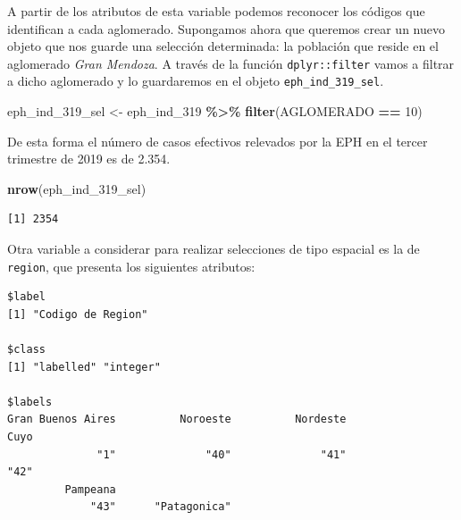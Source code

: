 \documentclass[
]{article}
\newenvironment{Shaded}{\begin{snugshade}}{\end{snugshade}}
\newcommand{\DecValTok}[1]{\textcolor[rgb]{0.00,0.00,0.81}{#1}}
\newcommand{\FunctionTok}[1]{\textcolor[rgb]{0.13,0.29,0.53}{\textbf{#1}}}
\newcommand{\NormalTok}[1]{#1}
\newcommand{\OtherTok}[1]{\textcolor[rgb]{0.56,0.35,0.01}{#1}}
\newcommand{\SpecialCharTok}[1]{\textcolor[rgb]{0.81,0.36,0.00}{\textbf{#1}}}
\begin{document}
A partir de los atributos de esta variable podemos reconocer los códigos que identifican a cada aglomerado. Supongamos ahora que queremos crear un nuevo objeto que nos guarde una selección determinada: la población que reside en el aglomerado \emph{Gran Mendoza}. A través de la función \texttt{dplyr::filter} vamos a filtrar a dicho aglomerado y lo guardaremos en el objeto \texttt{eph\_ind\_319\_sel}.

\begin{Shaded}
\begin{Highlighting}[]
\NormalTok{eph\_ind\_319\_sel }\OtherTok{\textless{}{-}}\NormalTok{ eph\_ind\_319 }\SpecialCharTok{\%\textgreater{}\%}
    \FunctionTok{filter}\NormalTok{(AGLOMERADO }\SpecialCharTok{==} \DecValTok{10}\NormalTok{)}
\end{Highlighting}
\end{Shaded}

De esta forma el número de casos efectivos relevados por la EPH en el tercer trimestre de 2019 es de 2.354.

\begin{Shaded}
\begin{Highlighting}[]
\FunctionTok{nrow}\NormalTok{(eph\_ind\_319\_sel)}
\end{Highlighting}
\end{Shaded}

\begin{verbatim}
[1] 2354
\end{verbatim}

Otra variable a considerar para realizar selecciones de tipo espacial es la de \texttt{region}, que presenta los siguientes atributos:

\begin{Shaded}
\end{Shaded}

\begin{verbatim}
$label
[1] "Codigo de Region"

$class
[1] "labelled" "integer" 

$labels
Gran Buenos Aires          Noroeste          Nordeste              Cuyo 
              "1"              "40"              "41"              "42" 
         Pampeana                   
             "43"      "Patagonica" 
\end{verbatim}
\end{document}

